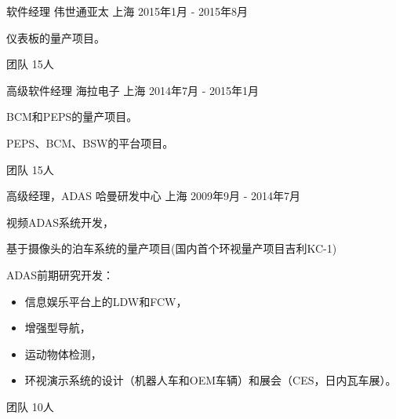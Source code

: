 \documentclass[../cv_cn.tex]{subfiles}
\begin{document}
\begin{cventries}
	\cventry
	{软件经理} %
	{伟世通亚太} %
	{上海} %
	{2015年1月 - 2015年8月} %
	{
		\begin{cvitems}
			\item 仪表板的量产项目。
			\item 团队 15人
		\end{cvitems}
	}

	\cventry
	{高级软件经理} %
	{海拉电子} %
	{上海} %
	{2014年7月 - 2015年1月} %
	{
		\begin{cvitems}
			\item BCM和PEPS的量产项目。
			\item PEPS、BCM、BSW的平台项目。
			\item 团队 15人
		\end{cvitems}
	}

	\cventry
	{高级经理，ADAS} %
	{哈曼研发中心} %
	{上海} %
	{2009年9月 - 2014年7月} %
	{
		\begin{cvitems}
			\item 视频ADAS系统开发，
			\item 基于摄像头的泊车系统的量产项目(国内首个环视量产项目吉利KC-1)
			\item ADAS前期研究开发：
			\begin{itemize}
				\item 信息娱乐平台上的LDW和FCW，
				\item 增强型导航，
				\item 运动物体检测，
				\item 环视演示系统的设计（机器人车和OEM车辆）和展会（CES，日内瓦车展）。
			\end{itemize}
			\item 团队 10人
		\end{cvitems}
	}
\end{cventries}
\end{document}
